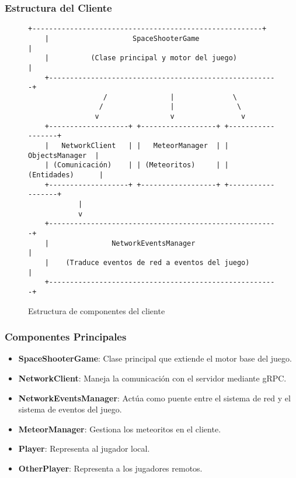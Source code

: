 \documentclass[11pt,letterpaper]{article}
\begin{document}
\subsubsection{Estructura del Cliente}

\begin{figure}[H]
    \centering
    \begin{lstlisting}[language=text]
    +-------------------------------------------------------+
    |                    SpaceShooterGame                   |
    |          (Clase principal y motor del juego)          |
    +-------------------------------------------------------+
                  /               |              \
                 /                |               \
                v                 v                v
    +-------------------+ +------------------+ +------------------+
    |   NetworkClient   | |   MeteorManager  | |  ObjectsManager  |
    | (Comunicación)    | | (Meteoritos)     | | (Entidades)      |
    +-------------------+ +------------------+ +------------------+
            |
            v
    +-------------------------------------------------------+
    |               NetworkEventsManager                    |
    |    (Traduce eventos de red a eventos del juego)       |
    +-------------------------------------------------------+
    \end{lstlisting}
    \caption{Estructura de componentes del cliente}
\end{figure}

\subsubsection{Componentes Principales}

\begin{itemize}
    \item \textbf{SpaceShooterGame}: Clase principal que extiende el motor base del juego.
    
    \item \textbf{NetworkClient}: Maneja la comunicación con el servidor mediante gRPC.
    
    \item \textbf{NetworkEventsManager}: Actúa como puente entre el sistema de red y el sistema de eventos del juego.
    
    \item \textbf{MeteorManager}: Gestiona los meteoritos en el cliente.
    
    \item \textbf{Player}: Representa al jugador local.
    
    \item \textbf{OtherPlayer}: Representa a los jugadores remotos.
\end{itemize}
\end{document}
